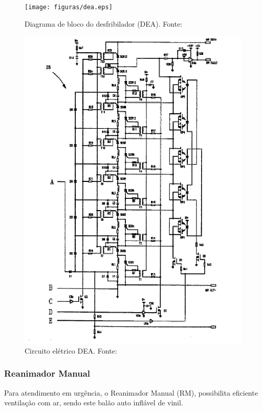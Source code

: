 \begin{figure}[!h]
	\centering
	  \texttt{[image: figuras/dea.eps]}
	\caption{Diagrama de bloco do desfribilador (DEA). Fonte: \cite{bloco}}
	\label{fig:dea}
\end{figure}
\begin{figure}[H]
	\centering
		\includegraphics[keepaspectratio=true,scale=1.2,angle=-90]{figuras/circuitodea.eps}
	\caption{Circuito elétrico DEA. Fonte: \cite{dea}}
	\label{fig:circuitodea}
\end{figure}

\subsubsection{Reanimador Manual}
Para atendimento em urgência, o Reanimador Manual (RM), possibilita eficiente ventilação com ar, sendo este balão auto inflável de vinil.

